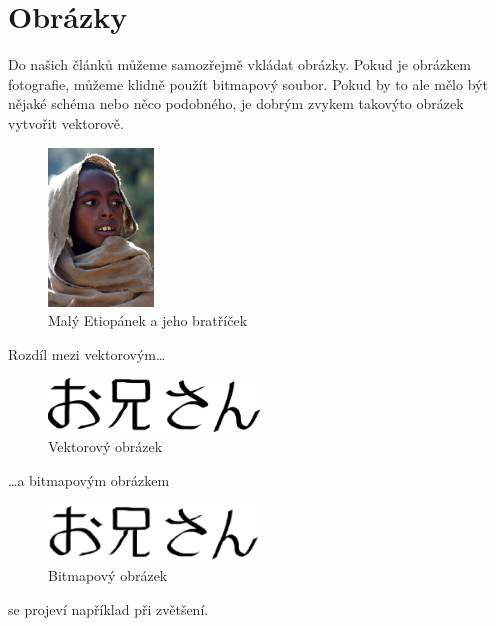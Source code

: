 \documentclass[a4paper, 11pt]{article}
\begin{document}
\section{Obrázky}
Do našich článků můžeme samozřejmě vkládat obrázky. Pokud je obrázkem fotografie, můžeme klidně použít
bitmapový soubor. Pokud by to ale mělo být nějaké schéma nebo něco podobného, je dobrým zvykem takovýto
obrázek vytvořit vektorově.
\begin{figure}[h]
\label{pic:etiopanci}
\centering
\includegraphics[width=0.25\textwidth]{etiopan.eps}
\caption{Malý Etiopánek a jeho bratříček}
\label{fig:etiopan}
\end{figure}
\clearpage
Rozdíl mezi vektorovým\dots
\begin{figure}[H]
\label{pic:vector}
\centering
\includegraphics[width=0.5\textwidth]{oniisan.eps}
\caption{Vektorový obrázek}
\label{fig:oniisan1}
\end{figure}
\noindent \dots a bitmapovým obrázkem
\begin{figure}[H]
\label{pic:bitmap}
\centering
\includegraphics[width=0.5\textwidth]{oniisan2.eps}
\caption{Bitmapový obrázek}
\label{fig:oniisan2}
\end{figure} 
\noindent se projeví například při zvětšení.
\end{document}
